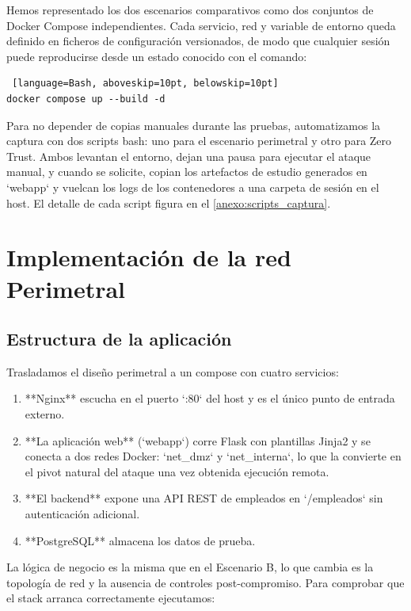 \documentclass[11pt,spanish,listoffigures,listoftables]{tfgetsinf}
\begin{document}
    Hemos representado los dos escenarios comparativos como dos conjuntos de Docker Compose independientes. Cada servicio, red y variable de entorno queda definido en ficheros de configuración versionados, de modo que cualquier sesión puede reproducirse desde un estado conocido con el comando:
    
    \begin{lstlisting} [language=Bash, aboveskip=10pt, belowskip=10pt]
docker compose up --build -d
    \end{lstlisting}
    
    Para no depender de copias manuales durante las pruebas, automatizamos la captura con dos scripts bash: uno para el escenario perimetral y otro para Zero Trust. Ambos levantan el entorno, dejan una pausa para ejecutar el ataque manual, y cuando se solicite, copian los artefactos de estudio generados en `webapp` y vuelcan los logs de los contenedores a una carpeta de sesión en el host. El detalle de cada script figura en el \ref{anexo:scripts_captura}.
    
    \section{Implementación de la red Perimetral}
        \subsection{Estructura de la aplicación}
        Trasladamos el diseño perimetral a un compose con cuatro servicios:
        \begin{enumerate}
            \item **Nginx** escucha en el puerto `:80` del host y es el único punto de entrada externo.
            \item **La aplicación web** (`webapp`) corre Flask con plantillas Jinja2 y se conecta a dos redes Docker: `net\_dmz` y `net\_interna`, lo que la convierte en el pivot natural del ataque una vez obtenida ejecución remota.
            \item **El backend** expone una API REST de empleados en `/empleados` sin autenticación adicional.
            \item **PostgreSQL** almacena los datos de prueba.
        \end{enumerate}
        
        La lógica de negocio es la misma que en el Escenario B, lo que cambia es la topología de red y la ausencia de controles post-compromiso. Para comprobar que el stack arranca correctamente ejecutamos:
        
\end{document}

